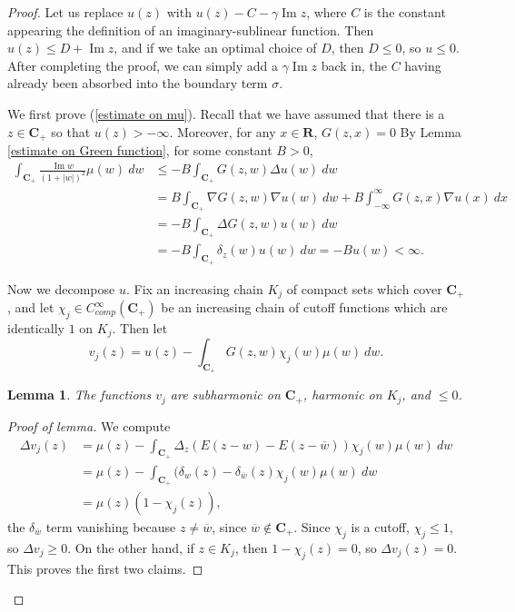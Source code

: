 \documentclass[12pt]{report}
\newcommand{\RR}{\mathbf{R}}
\newcommand{\CC}{\mathbf{C}}
\renewcommand{\Im}{\operatorname{Im}}
\newtheorem{lemma}[theorem]{Lemma}
\theoremstyle{definition}
\theoremstyle{remark}
\begin{document}
\begin{proof}
    Let us replace $u(z)$ with $u(z) - C - \gamma \Im z$, where $C$ is the constant appearing the definition of an imaginary-sublinear function. Then $u(z) \leq D + \Im z$, and if we take an optimal choice of $D$, then $D \leq 0$, so $u \leq 0$. After completing the proof, we can simply add a $\gamma \Im z$ back in, the $C$ having already been absorbed into the boundary term $\sigma$.

    We first prove (\ref{estimate on mu}). Recall that we have assumed that there is a $z \in \CC_+$ so that $u(z) > -\infty$. Moreover, for any $x \in \RR$, $G(z, x) = 0$ By Lemma \ref{estimate on Green function}, for some constant $B > 0$,
\begin{align*}\int_{\CC_+} \frac{\Im w}{(1 + |w|)^2} \mu(w) ~dw &\leq -B\int_{\CC_+} G(z, w) \Delta u(w) ~dw
    \\&= B \int_{\CC_+} \nabla G(z, w) \nabla u(w) ~dw + B\int_{-\infty}^\infty G(z, x) \nabla u(x) ~dx\\
    &= -B \int_{\CC_+} \Delta G(z, w) u(w) ~dw \\&= -B\int_{\CC_+} \delta_z(w) u(w) ~dw = -Bu(w) < \infty.
  \end{align*}

    Now we decompose $u$. Fix an increasing chain $K_j$ of compact sets which cover $\CC_+$, and let $\chi_j \in C^\infty_{comp}(\CC_+)$ be an increasing chain of cutoff functions which are identically $1$ on $K_j$. Then let
    $$v_j(z) = u(z) - \int_{\CC_+} G(z, w) \chi_j(w)\mu(w) ~dw.$$
\begin{lemma}
    The functions $v_j$ are subharmonic on $\CC_+$, harmonic on $K_j$, and $\leq 0$.
\end{lemma}
\begin{proof}[Proof of lemma]
    We compute
\begin{align*}
    \Delta v_j(z) &= \mu(z) - \int_{\CC_+} \Delta_z(E(z - w) - E(z - \overline w)) \chi_j(w) \mu(w) ~dw \\&= \mu(z) - \int_{\CC_+} (\delta_w(z) - \delta_{\overline w}(z) \chi_j(w) \mu(w) ~dw \\&= \mu(z)(1 - \chi_j(z)),
\end{align*}
    the $\delta_{\overline w}$ term vanishing because $z \neq \overline w$, since $\overline w \notin \CC_+$. Since $\chi_j$ is a cutoff, $\chi_j \leq 1$, so $\Delta v_j \geq 0$. On the other hand, if $z \in K_j$, then $1 - \chi_j(z) = 0$, so $\Delta v_j(z) = 0$. This proves the first two claims.


\end{proof}
\end{proof}
\end{document}
